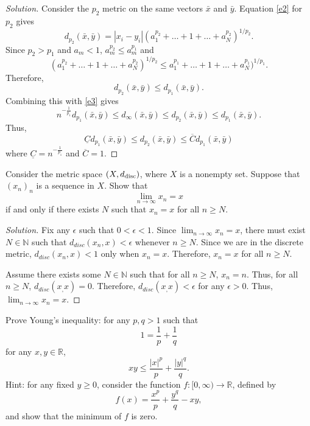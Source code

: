 \documentclass[11pt,letterpaper]{article}
\newcommand{\N}{\mathbb{N}}
\newcommand{\R}{\mathbb{R}}
\newenvironment{prob}[1]
  {\renewcommand\theinnerprob{#1}\innerprob}
  {\endinnerprob}
\newenvironment{solution}
  {\renewcommand\qedsymbol{}\begin{proof}[Solution]}
  {\end{proof}\bigskip}
\begin{document}
\begin{solution}
	Consider the $p_2$ metric on the same vectors $\bar x$ and $\bar y$. Equation \eqref{e2} for $p_2$ gives $$d_{p_2}(\bar x, \bar y) = |x_i-y_i| (a_1^{p_2} + \dotsc + 1 + \dotsc + a_N^{p_2})^{1/p_2}.$$ Since $p_2 > p_1$ and $a_m < 1$, $a_m^{p_2}\leq a_m^{p_1}$ and $$(a_1^{p_2} + \dotsc + 1 + \dotsc + a_N^{p_2})^{1/p_2} \leq a_1^{p_1} + \dotsc + 1 + \dotsc + a_N^{p_1})^{1/p_1}.$$ Therefore, $$d_{p_2}(\bar x, \bar y) \leq d_{p_1}(\bar x, \bar y).$$ Combining this with \eqref{e3} gives $$n^{-\frac{1}{p_1}}d_{p_1}(\bar x, \bar y) \leq d_\infty(\bar x, \bar y) \leq d_{p_2}(\bar x, \bar y) \leq d_{p_1}(\bar x, \bar y).$$ Thus, $$\underline C d_{p_1}(\bar x, \bar y) \leq d_{p_2}(\bar x, \bar y)
	\leq \overline C d_{p_1}(\bar x, \bar y)$$ where $\underline C = n^{-\frac{1}{p_1}}$ and $\overline C = 1$.
	
\end{solution}
\newpage






\begin{prob}{3}  %
Consider the metric space $(X, d_{\rm disc})$, where $X$ is a nonempty set.  Suppose that $(x_n)_n$ is a sequence in $X$.  Show that
\[
	\lim_{n\to\infty} x_n = x
\]
if and only if there exists $N$ such that $x_n = x$ for all $n \geq N$.
\end{prob}
\begin{solution}
	Fix any $\epsilon$ such that $0 < \epsilon < 1$. Since $\lim_{n\to\infty} x_n = x$, there must exist $N \in \N $ such that $d_{disc}(x_n,x)< \epsilon$ whenever $n\geq N$. Since we are in the discrete metric, $d_{disc}(x_n,x)< 1$ only when $x_n = x$. Therefore, $x_n = x$ for all $n\geq N$.
	
	Assume there exists some $N\in \N$ such that for all $n\geq N$, $x_n = n$. Thus, for all $n\geq N$, $d_{disc}(x_, x)  = 0$. Therefore, $d_{disc}(x_, x) < \epsilon$ for any $\epsilon > 0$. Thus, $\lim_{n\to\infty} x_n = x$.
\end{solution}
\newpage



\begin{prob}{4}  %
Prove Young's inequality: for any $p,q >1$ such that
\[
	1
		= \frac{1}{p} + \frac{1}{q}
\]
for any $x,y\in \R$,
\[
	xy \leq \frac{|x|^p}{p} + \frac{|y|^q}{q}.
\]
Hint: for any fixed $y \geq 0$, consider the function $f: [0,\infty) \to \R$, defined by
\[
	f(x) = \frac{x^p}{p} + \frac{y^q}{q} - xy,
\]
and show that the minimum of $f$ is zero.
\end{prob}
\end{document}
